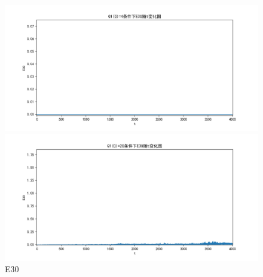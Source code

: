\documentclass[10pt, a4paper]{article}
\begin{document}
    \begin{figure}[H]
        \begin{minipage}[t]{0.49\textwidth}
            \centering
            \includegraphics[width=\textwidth]{./q5_pics/cmp/E30.png}
        \end{minipage}
        \begin{minipage}[t]{0.49\textwidth}
            \centering
            \includegraphics[width=\textwidth]{./q5_pics/exp/E30.png}
        \end{minipage}
        \caption{E30}\label{fig:E30 in q5}
    \end{figure}
\end{document}
